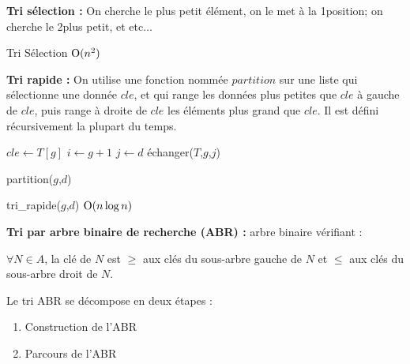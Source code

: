 \documentclass[a4paper, 8pt]{article}
\begin{document}
\begin{multicols*}{3}
\textbf{Tri sélection :} On cherche le plus petit élément, on le met à la 1\iere position; on cherche le 2\ieme plus petit, et etc$\hdots$

\begin{algorithm}[H]
 \caption{Tri Sélection $\text{O}(n^2)$}
\end{algorithm}

\textbf{Tri rapide :} On utilise une fonction nommée $partition$ sur une liste qui sélectionne une donnée $cle$, et qui range les données plus petites que $cle$ à gauche de $cle$, puis range à droite de $cle$ les éléments plus grand que $cle$. Il est défini récursivement la plupart du temps.
\begin{algorithm}[H]
  $cle \longleftarrow T\left[g\right]$ \;
  $i \longleftarrow g+1$ \;
  $j \longleftarrow d$ \;
  	échanger($T$,$g$,$j$)\;
 \caption{partition($g$,$d$)}
\end{algorithm}
\begin{algorithm}[H]
 \caption{tri\_rapide($g$,$d$) $\text{O}(n\log n)$}
\end{algorithm}
\medskip

\textbf{Tri par arbre binaire de recherche (ABR) :} arbre binaire vérifiant :
\begin{changemargin}{0.5cm}{0.5cm} 
\begin{center}
$\forall N\in A$, la clé de $N$ est $\geqslant$ aux clés du sous-arbre gauche de $N$ et $\leqslant$ aux clés du sous-arbre droit de $N$.
\end{center}
\end{changemargin}

Le tri ABR se décompose en deux étapes :
\begin{enumerate}
\item Construction de l'ABR 
\item Parcours de l'ABR
\end{enumerate}


\end{multicols*}
\end{document}

